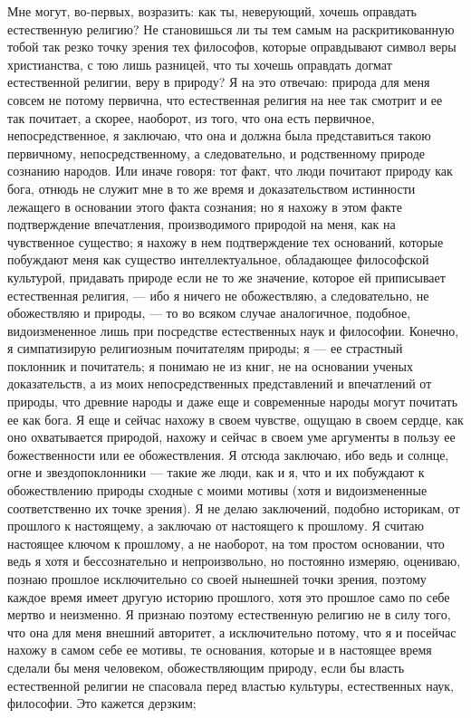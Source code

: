 \documentclass[12pt]{article}
\begin{document}
Мне могут, во-первых, возразить: как ты, неверующий, хочешь оправдать естественную религию? Не становишься ли ты тем самым на раскритикованную тобой так резко точку зрения тех философов, которые оправдывают символ веры христианства, с тою лишь разницей, что ты хочешь оправдать догмат естественной религии, веру в природу? Я на это отвечаю: природа для меня совсем не потому первична, что естественная религия на нее так смотрит и ее так почитает, а скорее, наоборот, из того, что она есть первичное, непосредственное, я заключаю, что она и должна была представиться такою первичному, непосредственному, а следовательно, и родственному природе сознанию народов. Или иначе говоря: тот факт, что люди почитают природу как бога, отнюдь не служит мне в то же время и доказательством истинности лежащего в основании этого факта сознания; но я нахожу в этом факте подтверждение впечатления, производимого природой на меня, как на чувственное существо; я нахожу в нем подтверждение тех оснований, которые побуждают меня как существо интеллектуальное, обладающее философской культурой, придавать природе если не то же значение, которое ей приписывает естественная религия, --- ибо я ничего не обожествляю, а следовательно, не обожествляю и природы, --- то во всяком случае аналогичное, подобное, видоизмененное лишь при посредстве естественных наук и философии. Конечно, я симпатизирую религиозным почитателям природы; я --- ее страстный поклонник и почитатель; я понимаю не из книг, не на основании ученых доказательств, а из моих непосредственных представлений и впечатлений от природы, что древние народы и даже еще и современные народы могут почитать ее как бога. Я еще и сейчас нахожу в своем чувстве, ощущаю в своем сердце, как оно охватывается природой, нахожу и сейчас в своем уме аргументы в пользу ее божественности или ее обожествления. Я отсюда заключаю, ибо ведь и солнце, огне и звездопоклонники --- такие же люди, как и я, что и их побуждают к обожествлению природы сходные с моими мотивы (хотя и видоизмененные соответственно их точке зрения). Я не делаю заключений, подобно историкам, от прошлого к настоящему, а заключаю от настоящего к прошлому. Я считаю настоящее ключом к прошлому, а не наоборот, на том простом основании, что ведь я хотя и бессознательно и непроизвольно, но постоянно измеряю, оцениваю, познаю прошлое исключительно со своей нынешней точки зрения, поэтому каждое время имеет другую историю прошлого, хотя это прошлое само по себе мертво и неизменно. Я признаю поэтому естественную религию не в силу того, что она для меня внешний авторитет, а исключительно потому, что я и посейчас нахожу в самом себе ее мотивы, те основания, которые и в настоящее время сделали бы меня человеком, обожествляющим природу, если бы власть естественной религии не спасовала перед властью культуры, естественных наук, философии. Это кажется дерзким; 
\end{document}
